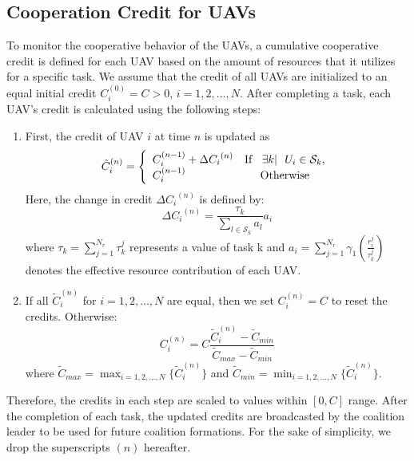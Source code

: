 \documentclass[conference]{IEEEtran}
\theoremstyle{remark}
\theoremstyle{lemma}
\begin{document}
\subsection{Cooperation Credit for UAVs} \label{sec:credit}
To monitor the cooperative behavior of the UAVs, a cumulative cooperative credit is defined for each UAV based on the amount of resources that it utilizes for a specific task. We assume that the credit of all UAVs are initialized to an equal initial credit $C_i^{(0)} = C > 0$, $i = 1,2,\ldots,N$. After completing a task, each UAV's credit is calculated using the following steps:

\begin{enumerate}
  \item First, the credit of UAV $i$ at time $n$ is updated as
  \begin{equation}
      \tilde{C}_i^{(n)} =
          \left\{\begin{array}{l c}
               C_i^{(n-1)} + \Delta{C_i}^{(n)} & \mbox{If \;\;} \exists k | ~~U_i \in \mathcal{S}_k, \\
               C_i^{(n-1)} & \mbox{Otherwise}
          \end{array}\right.
  \end{equation}
Here, the change in credit $\Delta{C_i}^{(n)}$ is defined by:
  \begin{equation}
    \Delta{C_i}^{(n)} = \frac{\tau_k}{\sum_{l \in \mathcal{S}_k} a_l} a_i
  \end{equation}
where $\tau_k = \sum_{j = 1}^{N_r}\tau_k^j$ represents a value of task k and $a_i = \sum_{j = 1}^{N_r} \gamma_1(\frac{r_i^j}{\tau_k^j})$ denotes the effective resource contribution of each UAV.

\item If all $\tilde{C}_i^{(n)}$ for $i = 1,2,\ldots,N$ are equal, then we set $C_i^{(n)} = C$ to reset the credits. Otherwise:
  \begin{equation}
    {C}_i^{(n)} = C \frac{\tilde{C}_i^{(n)} - \tilde{C}_{min}}{\tilde{C}_{max}-\tilde{C}_{min}}
  \end{equation}
where $\tilde{C}_{max} = \max_{i=1,2,\ldots,N}{\{\tilde{C}_i^{(n)}\}}$ and $\tilde{C}_{min} = \min_{i=1,2,\ldots,N}{\{\tilde{C}_i^{(n)}\}}$.
\end{enumerate}
Therefore, the credits in each step are scaled to values within $[0,C]$ range. After the completion of each task, the updated credits are broadcasted by the coalition leader to be used for future coalition formations. For the sake of simplicity, we drop the superscripts $(n)$ hereafter.
\end{document}
